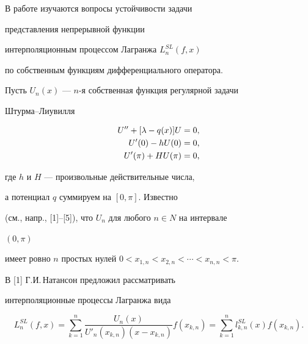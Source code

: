  


\date{} 




\pagestyle{plain} %


 




\maketitle 


\label{begin} 


 


 


В работе изучаются вопросы устойчивости задачи 


представления непрерывной функции 


интерполяционным процессом Лагранжа $L^{SL}_n(f,x)$ 


по собственным функциям дифференциального оператора. 


Пусть $U_n(x)$ --- $n$-я собственная функция регулярной задачи 


Штурма--Лиувилля 


\begin{align} 


U''+[\lambda-q(x)]U&=0, \\ 


U'(0)-h U(0)&=0,\notag \\ 


U'(\pi)+H U(\pi)&=0, 


\end{align} 


где $h$ и $H$ --- произвольные действительные числа, 


а потенциал $q$ суммируем на $[0,\pi]$. Известно 


(см., напр., [1]--[5]), что $U_n$ для любого $n\in N$ на интервале 


$(0,\pi)$ 


имеет ровно $n$ простых нулей $0<x_{1,n}<x_{2,n}<\dotsb<x_{n,n}<\pi$. 


 


В [1] Г.И.\,Натансон предложил рассматривать 


интерполяционные процессы Лагранжа вида 


\begin{equation} 


L^{SL}_n(f,x)=\sum^n_{k=1} 


\frac{U_n(x)}{U'_n(x_{k,n})(x-x_{k,n})}f(x_{k,n})= 


\sum^n_{k=1}l^{SL}_{k,n}(x)f(x_{k,n}). 


\end{equation} 


